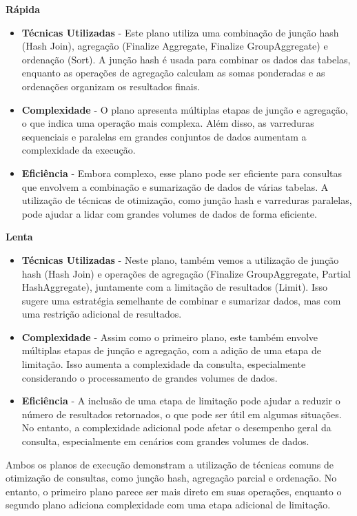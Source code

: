\documentclass{article}
\begin{document}
\textbf{Rápida}\\
\begin{itemize}
  \item \textbf{Técnicas Utilizadas} - Este plano utiliza uma combinação de junção hash (Hash Join), agregação (Finalize Aggregate, Finalize GroupAggregate) e ordenação (Sort). A junção hash é usada para combinar os dados das tabelas, enquanto as operações de agregação calculam as somas ponderadas e as ordenações organizam os resultados finais.
  \item \textbf{Complexidade} - O plano apresenta múltiplas etapas de junção e agregação, o que indica uma operação mais complexa. Além disso, as varreduras sequenciais e paralelas em grandes conjuntos de dados aumentam a complexidade da execução.
  \item \textbf{Eficiência} - Embora complexo, esse plano pode ser eficiente para consultas que envolvem a combinação e sumarização de dados de várias tabelas. A utilização de técnicas de otimização, como junção hash e varreduras paralelas, pode ajudar a lidar com grandes volumes de dados de forma eficiente.
\end{itemize}

\textbf{Lenta}\\
\begin{itemize}
  \item \textbf{Técnicas Utilizadas} - Neste plano, também vemos a utilização de junção hash (Hash Join) e operações de agregação (Finalize GroupAggregate, Partial HashAggregate), juntamente com a limitação de resultados (Limit). Isso sugere uma estratégia semelhante de combinar e sumarizar dados, mas com uma restrição adicional de resultados.
  \item \textbf{Complexidade} - Assim como o primeiro plano, este também envolve múltiplas etapas de junção e agregação, com a adição de uma etapa de limitação. Isso aumenta a complexidade da consulta, especialmente considerando o processamento de grandes volumes de dados.
  \item \textbf{Eficiência} - A inclusão de uma etapa de limitação pode ajudar a reduzir o número de resultados retornados, o que pode ser útil em algumas situações. No entanto, a complexidade adicional pode afetar o desempenho geral da consulta, especialmente em cenários com grandes volumes de dados.

\end{itemize}

Ambos os planos de execução demonstram a utilização de técnicas comuns de otimização de consultas, como junção hash, agregação parcial e ordenação. No entanto, o primeiro plano parece ser mais direto em suas operações, enquanto o segundo plano adiciona complexidade com uma etapa adicional de limitação.\\
\end{document}
